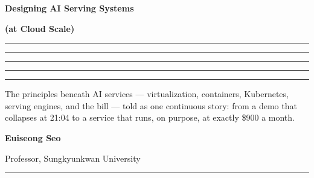 \thispagestyle{empty}
\begingroup
\setlength{\parskip}{0pt}\raggedright

\par
\vspace{3pt}{\color{tbbtableborder}\rule{\linewidth}{0.4pt}}\par

\vspace{2.6cm}

{\bfseries\fontsize{36}{40}\selectfont\color{tbbink}Designing AI Serving Systems\par}
\vspace{6pt}
{\bfseries\fontsize{28}{32}\selectfont\color{tbbblue}(at Cloud Scale)\par}

\vspace{16pt}
\noindent\textcolor{tbbblue}{\rule{0.2\linewidth}{10pt}}%
\textcolor{tbbteal}{\rule{0.2\linewidth}{10pt}}%
\textcolor{tbbamber}{\rule{0.2\linewidth}{10pt}}%
\textcolor{tbbpurple}{\rule{0.2\linewidth}{10pt}}%
\textcolor{tbbred}{\rule{0.2\linewidth}{10pt}}\par

\vspace{18pt}
{\fontsize{15}{21}\selectfont\color{tbbgray}%
The principles beneath AI services --- virtualization, containers, Kubernetes, serving engines, and the bill --- told as one continuous story: from a demo that collapses at 21:04 to a service that runs, on purpose, at exactly \$900 a month.\par}

\vfill

{\bfseries\fontsize{24}{28}\selectfont\color{tbbink}Euiseong Seo\par}
\vspace{4pt}
{\fontsize{14}{18}\selectfont\color{tbbgray}Professor, Sungkyunkwan University\par}

\vspace{1.4cm}
{\color{tbbtableborder}\rule{\linewidth}{0.4pt}}\par\vspace{6pt}
\endgroup
\clearpage

